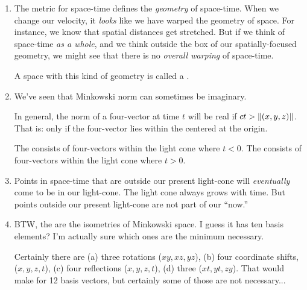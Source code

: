 \begin{enumerate}
  \item The metric for space-time defines the \emph{geometry} of
  space-time. When we change our velocity, it \emph{looks} like we have
  warped the geometry of space. For instance, we know that spatial
  distances get stretched. But if we think of space-time \emph{as a
  whole}, and we think outside the box of our spatially-focused
  geometry, we might see that there is no \emph{overall warping} of
  space-time.

  A space with this kind of geometry is called a .

  \item We've seen that Minkowski norm can sometimes be imaginary.

  In general, the norm of a four-vector at time $t$ will be real if $ct
  > \left\Vert \mathopen{}\left( {x, y, z} \right)\mathclose{} \right\Vert$. That is: only if the four-vector lies
  within the  centered at the origin.

  The  consists of four-vectors within the light
  cone where $t < 0$. The  consists of
  four-vectors within the light cone where $t > 0$.

  \item Points in space-time that are outside our present light-cone
  will \emph{eventually} come to be in our light-cone. The light cone
  always grows with time. But points outside our present light-cone are
  not part of our ``now.''

  \item BTW, the  are the isometries of Minkowski
  space. I guess it has ten basis elements? I'm actually sure which ones
  are the minimum necessary.

  Certainly there are (a) three rotations ($xy, xz, yz$), (b) four
  coordinate shifts, ($x, y, z, t$), (c) four reflections ($x, y, z,
  t$), (d) three  ($xt, yt, zy$). That would make for 12
  basis vectors, but certainly some of those are not necessary...

\end{enumerate}
